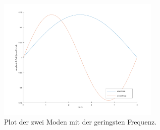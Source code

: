 \documentclass[Protokollheft.tex]{subfiles}
\begin{document}
	\begin{figure}[h]
		\centering
		\includegraphics[trim = 20mm 15mm 20mm 15mm, clip, width=0.7\textwidth]{modes.pdf}
		\caption{Plot der zwei Moden mit der geringsten Frequenz.}
		
	\end{figure}
	
\end{document}
